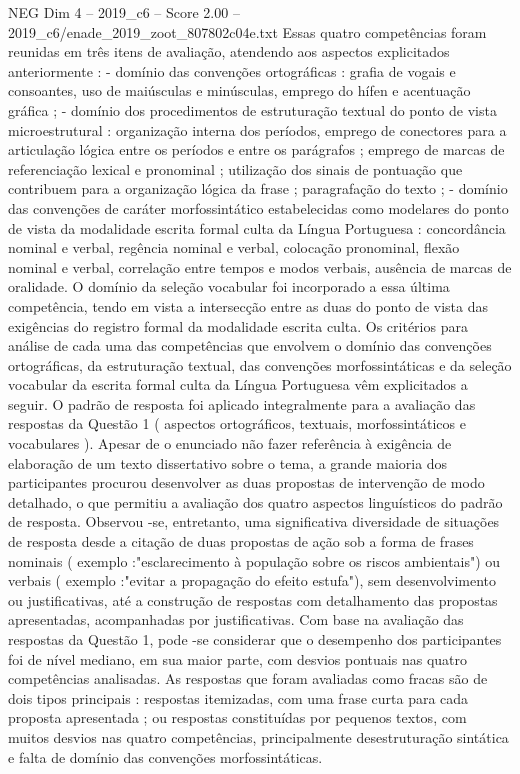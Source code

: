 \begin{textsample}{NEG Dim 4 – 2019\_c6 – Score 2.00 – 2019\_c6/enade\_2019\_zoot\_807802c04e.txt}
Essas quatro competências foram reunidas em três itens de avaliação, atendendo aos aspectos explicitados anteriormente : - domínio das convenções ortográficas : grafia de vogais e consoantes, uso de maiúsculas e minúsculas, emprego do hífen e acentuação gráfica ; - domínio dos procedimentos de estruturação textual do ponto de vista microestrutural : organização interna dos períodos, emprego de conectores para a articulação lógica entre os períodos e entre os parágrafos ; emprego de marcas de referenciação lexical e pronominal ; utilização dos sinais de pontuação que contribuem para a organização lógica da frase ; paragrafação do texto ; - domínio das convenções de caráter morfossintático estabelecidas como modelares do ponto de vista da modalidade escrita formal culta da Língua Portuguesa : concordância nominal e verbal, regência nominal e verbal, colocação pronominal, flexão nominal e verbal, correlação entre tempos e modos verbais, ausência de marcas de oralidade.
O domínio da seleção vocabular foi incorporado a essa última competência, tendo em vista a intersecção entre as duas do ponto de vista das exigências do registro formal da modalidade escrita culta.
Os critérios para análise de cada uma das competências que envolvem o domínio das convenções ortográficas, da estruturação textual, das convenções morfossintáticas e da seleção vocabular da escrita formal culta da Língua Portuguesa vêm explicitados a seguir.
O padrão de resposta foi aplicado integralmente para a avaliação das respostas da Questão 1 ( aspectos ortográficos, textuais, morfossintáticos e vocabulares ).
Apesar de o enunciado não fazer referência à exigência de elaboração de um texto dissertativo sobre o tema, a grande maioria dos participantes procurou desenvolver as duas propostas de intervenção de modo detalhado, o que permitiu a avaliação dos quatro aspectos linguísticos do padrão de resposta.
Observou -se, entretanto, uma significativa diversidade de situações de resposta desde a citação de duas propostas de ação sob a forma de frases nominais ( exemplo :"esclarecimento à população sobre os riscos ambientais") ou verbais ( exemplo :"evitar a propagação do efeito estufa"), sem desenvolvimento ou justificativas, até a construção de respostas com detalhamento das propostas apresentadas, acompanhadas por justificativas.
Com base na avaliação das respostas da Questão 1, pode -se considerar que o desempenho dos participantes foi de nível mediano, em sua maior parte, com desvios pontuais nas quatro competências analisadas.
As respostas que foram avaliadas como fracas são de dois tipos principais : respostas itemizadas, com uma frase curta para cada proposta apresentada ; ou respostas constituídas por pequenos textos, com muitos desvios nas quatro competências, principalmente desestruturação sintática e falta de domínio das convenções morfossintáticas.

\end{textsample}
